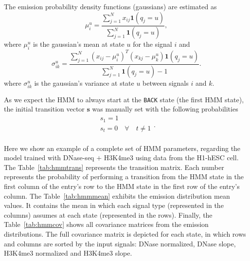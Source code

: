 The emission probability density functions (gaussians) are estimated as
\begin{equation}
  \label{eq:hmm.train.e.1}
  \mu^{u}_{i} = \frac{ \sum_{j=1}^{N} {x}_{ij} {\mathbf{1}}(q_j=u) }{ \sum_{j=1}^{N} {\mathbf{1}} (q_j=u) },
\end{equation}
where $ \mu^{u}_{i} $ is the gaussian's mean at state $u$ for the signal $i$ and
\begin{equation}
  \label{eq:hmm.train.e.2}
  {\sigma}^{u}_{ik} = \frac{\sum_{j=1}^{N} ({x}_{ij} - \mu^{u}_{i})^T({x}_{kj} - \mu^{u}_{k}) {\mathbf{1}} (q_j=u)}
  {\sum_{j=1}^{N} {\mathbf{1}} (q_j=u) - 1}.
\end{equation}
where $ \sigma^{u}_{ik} $ is the gaussian's variance at state $u$ between signals $i$ and $k$.

As we expect the HMM to always start at the {\tt BACK} state (the first HMM state), the initial transition vector $\mathbf{s}$ was manually set with the following probabilities
\begin{equation}
  \label{eq:hmm.train.s}
  \begin{array}{lcl}
    s_1 = 1 \\
    s_t = 0 \quad \forall \quad t \neq 1 \\
  \end{array}.
\end{equation}

Here we show an example of a complete set of HMM parameters, regarding the model trained with DNase-seq $+$ H3K4me3 using data from the H1-hESC cell. The Table~\ref{tab:hmmtrans} represents the transition matrix. Each number represents the probability of performing a transition from the HMM state in the first column of the entry's row to the HMM state in the first row of the entry's column. The Table~\ref{tab:hmmmean} exhibits the emission distribution mean values. It contains the mean in which each signal type (represented in the columns) assumes at each state (represented in the rows). Finally, the Table~\ref{tab:hmmcov} shows all covariance matrices from the emission distributions. The full covariance matrix is depicted for each state, in which rows and columns are sorted by the input signals: DNase normalized, DNase slope, H3K4me3 normalized and H3K4me3 slope.

